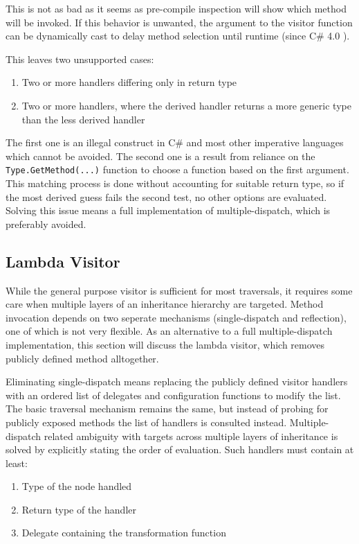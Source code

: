 \documentclass[twoside,openright]{uva-bachelor-thesis}
\newcommand{\code}[1]{\texttt{\footnotesize#1}}
\begin{document}
			This is not as bad as it seems as pre-compile inspection will show which method will be invoked. If this behavior is unwanted, the argument to the visitor function can be dynamically cast to delay method selection until runtime (since C\# 4.0 \cite{schildt2010c}). 
			
			This leaves two unsupported cases:
			\begin{enumerate}
				\item Two or more handlers differing only in return type
				\item Two or more handlers, where the derived handler returns a more generic type than the less derived handler
			\end{enumerate}
			
			The first one is an illegal construct in C\# and most other imperative languages which cannot be avoided. The second one is a result from reliance on the \code{Type.GetMethod(...)} function to choose a function based on the first argument. This matching process is done without accounting for suitable return type, so if the most derived guess fails the second test, no other options are evaluated. Solving this issue means a full implementation of multiple-dispatch, which is preferably avoided.
			
		\subsection{Lambda Visitor}
			While the general purpose visitor is sufficient for most traversals, it requires some care when multiple layers of an inheritance hierarchy are targeted. Method invocation depends on two seperate mechanisms (single-dispatch and reflection), one of which is not very flexible. As an alternative to a full multiple-dispatch implementation, this section will discuss the lambda visitor, which removes publicly defined method alltogether.
			
			Eliminating single-dispatch means replacing the publicly defined visitor handlers with an ordered list of delegates and configuration functions to modify the list. The basic traversal mechanism remains the same, but instead of probing for publicly exposed methods the list of handlers is consulted instead. Multiple-dispatch related ambiguity with targets across multiple layers of inheritance is solved by explicitly stating the order of evaluation. Such handlers must contain at least:
			\begin{enumerate}
				\item Type of the node handled
				\item Return type of the handler
				\item Delegate containing the transformation function
			\end{enumerate}
			
\end{document}
